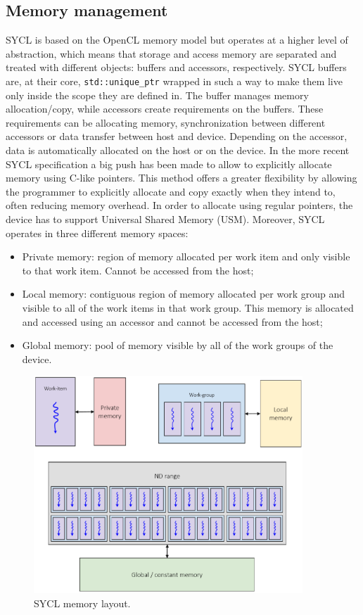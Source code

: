 \subsection{Memory management}
\label{ch:memory_management}
SYCL is based on the OpenCL memory model but operates at a higher level of abstraction, which means that storage and access memory are separated and treated with different objects: buffers and accessors, respectively. SYCL buffers are, at their core, \Verb "std::unique_ptr" wrapped in such a way to make them live only inside the scope they are defined in. The buffer manages memory allocation/copy, while accessors create requirements on the buffers. These requirements can be allocating memory, synchronization between different accessors or data transfer between host and device. Depending on the accessor, data is automatically allocated on the host or on the device. In the more recent SYCL specification a big push has been made to allow to explicitly allocate memory using C-like pointers. This method offers a greater flexibility by allowing the programmer to explicitly allocate and copy exactly when they intend to, often reducing memory overhead. In order to allocate using regular pointers, the device has to support Universal Shared Memory (USM). Moreover, SYCL operates in three different memory spaces: 
\begin{itemize}
    \item Private memory: region of memory allocated per work item and only visible to that work item. Cannot be accessed from the host;
    \item Local memory: contiguous region of memory allocated per work group and visible to all of the work items in that work group. This memory is allocated and accessed using an accessor and cannot be accessed from the host;
    \item Global memory: pool of memory visible by all of the work groups of the device.
\end{itemize}

\begin{figure}[H]
\centering
\includegraphics[width=0.9\textwidth]{media/sycl_memory_layout.png}
\caption{SYCL memory layout.}
\label{fig:nd-range-mem}
\end{figure}

